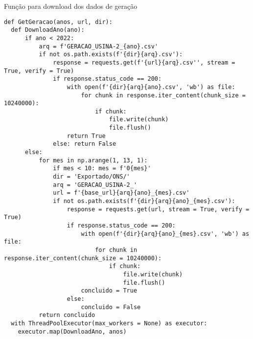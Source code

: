 \begin{codigo}[htb]
\caption{Função para download dos dados de geração}
\label{listing:get_geracao}
\begin{verbatim}
def GetGeracao(anos, url, dir):
  def DownloadAno(ano):
      if ano < 2022:
          arq = f'GERACAO_USINA-2_{ano}.csv'
          if not os.path.exists(f'{dir}{arq}.csv'):
              response = requests.get(f'{url}{arq}.csv'', stream = True, verify = True)
              if response.status_code == 200:
                  with open(f'{dir}{arq}{ano}.csv', 'wb') as file:
                      for chunk in response.iter_content(chunk_size = 10240000):
                          if chunk:
                              file.write(chunk)
                              file.flush()
                  return True
              else: return False
      else:
          for mes in np.arange(1, 13, 1):
              if mes < 10: mes = f'0{mes}'
              dir = 'Exportado/ONS/'
              arq = 'GERACAO_USINA-2_'
              url = f'{base_url}{arq}{ano}_{mes}.csv'
              if not os.path.exists(f'{dir}{arq}{ano}_{mes}.csv'):
                  response = requests.get(url, stream = True, verify = True)
                  if response.status_code == 200:
                      with open(f'{dir}{arq}{ano}_{mes}.csv', 'wb') as file:
                          for chunk in response.iter_content(chunk_size = 10240000):
                              if chunk:
                                  file.write(chunk)
                                  file.flush()
                      concluido = True
                  else:
                      concluido = False
          return concluido
  with ThreadPoolExecutor(max_workers = None) as executor:
    executor.map(DownloadAno, anos)
\end{verbatim}
\end{codigo}

\begin{table}[htb]
  \centering
    {
    }
\end{table}

